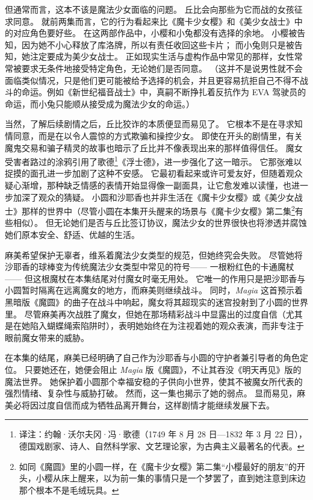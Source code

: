 但通常而言，这本不该是魔法少女面临的问题。
丘比会向那些为它而战的女孩征求同意。
就前两集而言，它的行为看起来比《魔卡少女樱》和《美少女战士》中的对应角色要好些。
在这两部作品中，小樱和小兔都没有选择的余地。
小樱被告知，因为她不小心释放了库洛牌，所以有责任收回这些卡片\cite{cardcaptor-sakura-episode1-2014}；
而小兔则只是被告知，她注定要成为美少女战士。
正如现实生活与虚构作品中常见的那样，女性常常被要求无条件地接受特定角色，无论她们是否同意\cite{connell1987gender-power}。
（这并不是说男性就不会面临类似情况，只是他们更可能被给予选择的机会，并且更容易抗拒自己不得不战斗的命运。例如《新世纪福音战士》中，真嗣不断挣扎着反抗作为 EVA 驾驶员的命运，而小兔只能顺从接受成为魔法少女的命运。）

当然，了解后续剧情之后，丘比狡诈的本质便显而易见了。
它根本不是在寻求知情同意，而是在以令人震惊的方式欺骗和操控少女。
即使在开头的剧情里，有关魔鬼交易和骗子精灵的故事也暗示了丘比并不像表现出来的那样值得信任。
魔女受害者路过的涂鸦引用了歌德\footnote{%
    译注：约翰·沃尔夫冈·冯·歌德（1749 年 8 月 28 日—1832 年 3 月 22 日），德国戏剧家、诗人、自然科学家、文艺理论家，为古典主义最著名的代表。
}《浮士德》，进一步强化了这一暗示。
它那张难以捉摸的面孔进一步加剧了这种不安感。
它最初看起来或许可爱友好，但随着观众疑心渐增，那种缺乏情感的表情开始显得像一副面具，让它愈发难以读懂，也进一步加深了观众的猜疑。
小圆和沙耶香也并非生活在《魔卡少女樱》或《美少女战士》那样的世界中（尽管小圆在本集开头醒来的场景与《魔卡少女樱》第二集\footnote{%
    如同《魔圆》里的小圆一样，在《魔卡少女樱》第二集“小樱最好的朋友”的开头，小樱从床上醒来，以为前一集的事情只是一个梦罢了，直到她注意到床边那个根本不是毛绒玩具。
}\cite{cardcaptor-sakura-episode2}有些相似）。
但无论她们是否与丘比签订协议，魔法少女的世界很快也将渗透并腐蚀她们原本安全、舒适、优越的生活。

麻美希望保护无辜者，维系着魔法少女类型的规范，但她终究会失败。
尽管她将沙耶香的球棒变为传统魔法少女类型中常见的符号——
一根粉红色的卡通魔杖——
但这根魔杖在本集结尾对付魔女时毫无用处。
它唯一的作用只是把沙耶香与小圆暂时隔离在远离魔女的地方，而麻美则继续战斗。
同时，\emph{Magia} 这首预示着黑暗版《魔圆》的曲子在战斗中响起，魔女将其超现实的迷宫投射到了小圆的世界里。
尽管麻美再次战胜了魔女，但她在那场精彩战斗中显露出的过度自信（尤其是在她陷入蝴蝶绳索陷阱时），表明她始终在为注视着她的观众表演，而非专注于眼前魔女带来的威胁。

在本集的结尾，麻美已经明确了自己作为沙耶香与小圆的守护者兼引导者的角色定位。
只要她还在，她便会阻止 \emph{Magia} 版《魔圆》，不让其吞没《明天再见》版的魔法世界。
她保护着小圆那个幸福安稳的子供向小世界，使其不被魔女所代表的强烈情绪、复杂性与威胁打破。
然而，这一集也揭示了她的弱点。
显而易见，麻美必将因过度自信而成为牺牲品离开舞台，这样剧情才能继续发展下去。
